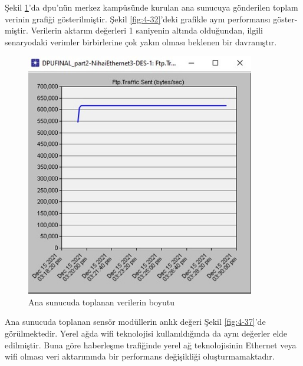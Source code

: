 Şekil \ref{fig:4-36}’da \gls{dpu}’nün merkez kampüsünde kurulan ana sunucuya gönderilen toplam verinin grafiği gösterilmiştir. Şekil \ref{fig:4-32}’deki grafikle aynı performansı göster-miştir. Verilerin aktarım değerleri 1 saniyenin altında olduğundan, ilgili senaryodaki verimler birbirlerine çok yakın olması beklenen bir davranıştır.


\begin{figure}[htbp]
\centerline{\includegraphics[width=10cm]{Resim/Sekil4-35.jpg}}
\caption{Ana sunucuda toplanan verilerin boyutu}
\label{fig:4-36}
\end{figure}


Ana sunucuda toplanan sensör modüllerin anlık değeri Şekil \ref{fig:4-37}’de görülmektedir. Yerel ağda \gls{wifi} teknolojisi kullanıldığında da aynı değerler elde edilmiştir. Buna göre haberleşme trafiğinde yerel ağ teknolojisinin Ethernet veya \gls{wifi} olması veri aktarımında bir performans değişikliği oluşturmamaktadır.

